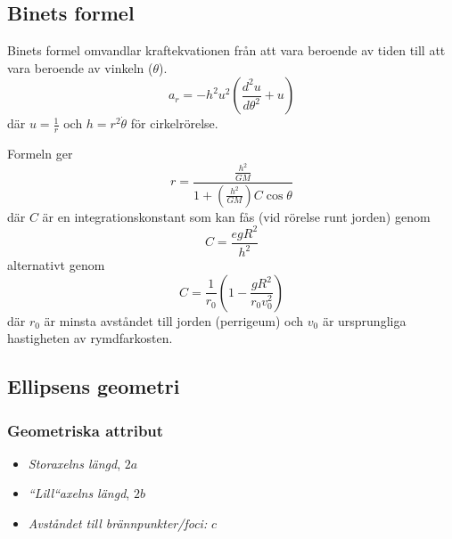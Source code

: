 \documentclass{article}
\newenvironment{ankiflashcard}[1]{}{}
\begin{document}
\begin{paracol}{2}
\begin{ankiflashcard}{Formulera Binets formel.}
\subsection{Binets formel}
Binets formel omvandlar kraftekvationen från att vara beroende av tiden till att vara beroende av vinkeln ($\theta$).
$$a_r = -h^2u^2\left(\frac{d^2u}{d\theta^2}+u\right)$$
där $u=\frac{1}{r}$ och $h=r^2\dot \theta$ för cirkelrörelse.
\end{ankiflashcard}

\begin{ankiflashcard}{Uttryck radie med hjälp av Binets formel}
    
Formeln ger
$$
r=\frac{\frac{h^2}{GM}}{1+(\frac{h^2}{GM})C\cos \theta}
$$
där $C$ är en integrationskonstant som kan fås (vid rörelse runt jorden) genom $$C=\frac{egR^2}{h^2}$$ alternativt genom $$C=\frac{1}{r_0}(1-\frac{gR^2}{r_0v_0^2})$$ där $r_0$ är minsta avståndet till jorden (perrigeum) och $v_0$ är ursprungliga hastigheten av rymdfarkosten.
\end{ankiflashcard}
\subsection{Ellipsens geometri}

\begin{ankiflashcard}{Hur benämns de olika sträckorna i ellipsen}
    
\subsubsection{Geometriska attribut}
\begin{itemize}
    \item \textit{Storaxelns längd}, $2a$
    \item  \textit{``Lill``axelns längd}, $2b$
    \item \textit{Avståndet till brännpunkter/foci:} $c$
\end{itemize}
\end{ankiflashcard}


\begin{ankiflashcard}{Ställ upp användbara samband kring ellipsens geometri.}

\end{ankiflashcard}
\end{paracol}
\end{document}

